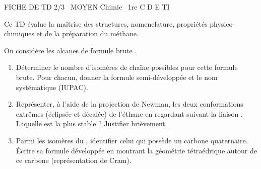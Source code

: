 \documentclass[11pt]{article}
\begin{document}
\begin{tcolorbox}[enhanced,colback=popink,colframe=popink,arc=10pt,boxrule=0pt,left=12pt,right=12pt,top=9pt,bottom=9pt]
{\color{white}\popxbold\small FICHE DE TD 2/3 \textbullet\ MOYEN \hfill Chimie \textbullet\ 1re C D E TI\par}
\end{tcolorbox}
\vspace{4pt}
Ce TD évalue la maîtrise des structures, nomenclature, propriétés physico-chimiques et de la préparation du méthane.

\begin{exercice}
On considère les alcanes de formule brute .
\begin{enumerate}
    \item Déterminer le nombre d'isomères de chaîne possibles pour cette formule brute. Pour chacun, donner la formule semi-développée et le nom systématique (IUPAC).
    \item Représenter, à l'aide de la projection de Newman, les deux conformations extrêmes (éclipsée et décalée) de l'éthane  en regardant suivant la liaison . Laquelle est la plus stable ? Justifier brièvement.
    \item Parmi les isomères du , identifier celui qui possède un carbone quaternaire. Écrire sa formule développée en montrant la géométrie tétraédrique autour de ce carbone (représentation de Cram).
\end{enumerate}
\end{exercice}
\end{document}
